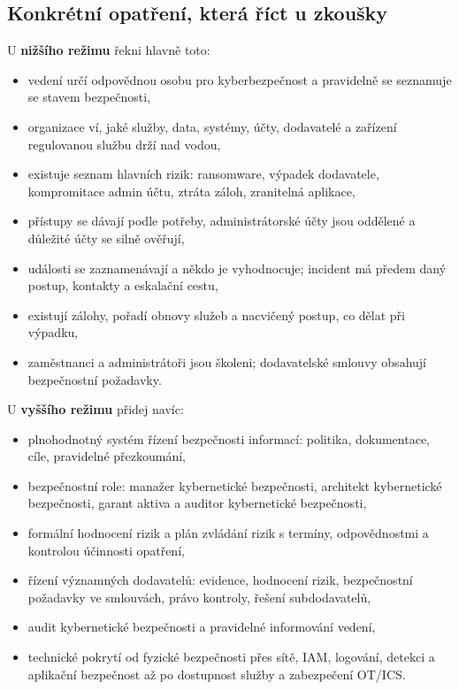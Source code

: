 \subsection*{Konkrétní opatření, která říct u zkoušky}
U \textbf{nižšího režimu} řekni hlavně toto:
\begin{itemize}
  \item vedení určí odpovědnou osobu pro kyberbezpečnost a pravidelně se seznamuje se stavem bezpečnosti,
  \item organizace ví, jaké služby, data, systémy, účty, dodavatelé a zařízení regulovanou službu drží nad vodou,
  \item existuje seznam hlavních rizik: ransomware, výpadek dodavatele, kompromitace admin účtu, ztráta záloh, zranitelná aplikace,
  \item přístupy se dávají podle potřeby, administrátorské účty jsou oddělené a důležité účty se silně ověřují,
  \item události se zaznamenávají a někdo je vyhodnocuje; incident má předem daný postup, kontakty a eskalační cestu,
  \item existují zálohy, pořadí obnovy služeb a nacvičený postup, co dělat při výpadku,
  \item zaměstnanci a administrátoři jsou školeni; dodavatelské smlouvy obsahují bezpečnostní požadavky.
\end{itemize}

U \textbf{vyššího režimu} přidej navíc:
\begin{itemize}
  \item plnohodnotný systém řízení bezpečnosti informací: politika, dokumentace, cíle, pravidelné přezkoumání,
  \item bezpečnostní role: manažer kybernetické bezpečnosti, architekt kybernetické bezpečnosti, garant aktiva a auditor kybernetické bezpečnosti,
  \item formální hodnocení rizik a plán zvládání rizik s termíny, odpovědnostmi a kontrolou účinnosti opatření,
  \item řízení významných dodavatelů: evidence, hodnocení rizik, bezpečnostní požadavky ve smlouvách, právo kontroly, řešení subdodavatelů,
  \item audit kybernetické bezpečnosti a pravidelné informování vedení,
  \item technické pokrytí od fyzické bezpečnosti přes sítě, IAM, logování, detekci a aplikační bezpečnost až po dostupnost služby a zabezpečení OT/ICS.
\end{itemize}

